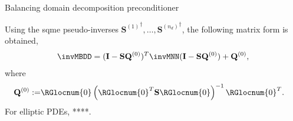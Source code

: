 \documentclass{article}
\begin{document}
\begin{algorithm}[ht]
	\caption{Balancing domain decomposition preconditioner}
	\label{alg:BDD}
	\begin{algorithmic}[1]
	\end{algorithmic}
\end{algorithm}


Using the sqme pseudo-inverses ${\mathbf{S}^{(1)}}^\dagger,\dots,{\mathbf{S}^{(n_d)}}^\dagger$, the following matrix form is obtained,
\begin{align}
\invMBDD=
(\mathbf{I}-\mathbf{S}\mathbf{Q}^{(0)})^T
\invMNN
(\mathbf{I}-\mathbf{S}\mathbf{Q}^{(0)})
+
{\mathbf{Q}^{(0)}},
\end{align}
where
\begin{align}
\mathbf{Q}^{(0)}:=&\RGlocnum{0}\left(\RGlocnum{0}^T\mathbf{S}\RGlocnum{0}\right)^{-1}\RGlocnum{0}^T.%
\end{align}
For elliptic PDEs, ****.
\end{document}
